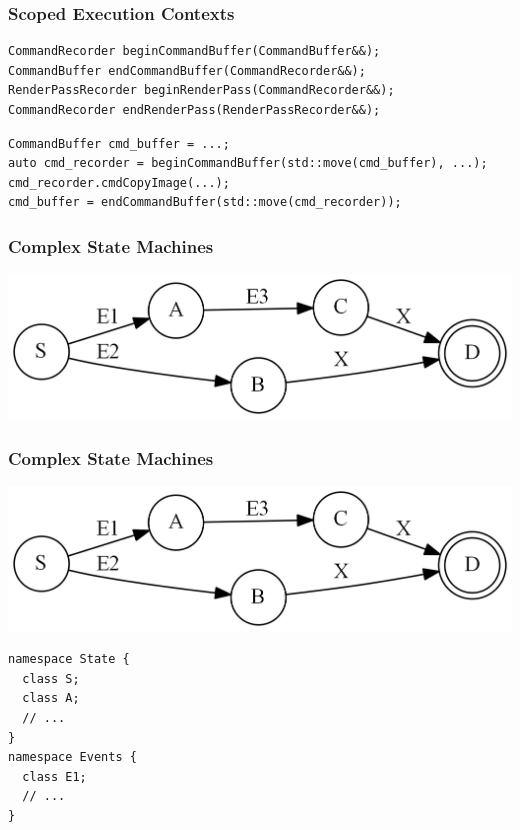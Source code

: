 \documentclass[aspectratio=169]{beamer}
\begin{document}
\begin{frame}[fragile]
  \frametitle{Scoped Execution Contexts}
  
  \begin{lstlisting}[style=cpp20]
CommandRecorder beginCommandBuffer(CommandBuffer&&);
CommandBuffer endCommandBuffer(CommandRecorder&&);
RenderPassRecorder beginRenderPass(CommandRecorder&&);
CommandRecorder endRenderPass(RenderPassRecorder&&);
  \end{lstlisting}
  
  \begin{lstlisting}[style=cpp20]
CommandBuffer cmd_buffer = ...;
auto cmd_recorder = beginCommandBuffer(std::move(cmd_buffer), ...);
cmd_recorder.cmdCopyImage(...);
cmd_buffer = endCommandBuffer(std::move(cmd_recorder));
  \end{lstlisting}
\end{frame}


\begin{frame}[fragile]
  \frametitle{Complex State Machines}
  
  \begin{center}
  \includegraphics[width=.9\textwidth]{ifgfx/state_machine.png}
  \end{center}
\end{frame}

\begin{frame}[fragile]
  \frametitle{Complex State Machines}
  
  \begin{center}
  \includegraphics[width=.4\textwidth]{ifgfx/state_machine.png}
  \end{center}
  
  \begin{lstlisting}[style=cpp20]
namespace State {
  class S;
  class A;
  // ...
}
namespace Events {
  class E1;
  // ...
}
  \end{lstlisting}
\end{frame}
\end{document}
